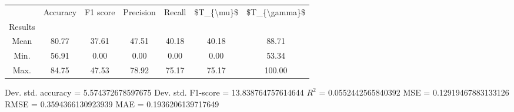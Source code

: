 \begin{tabular}{|c|c|c|c|c|c|c|}
\toprule
{} &  Accuracy &  F1 score &  Precision &  Recall &  \$T\_\{\textbackslash mu\}\$ &  \$T\_\{\textbackslash gamma\}\$ \\
Results &           &           &            &         &            &               \\
\hline
Mean    &     80.77 &     37.61 &      47.51 &   40.18 &      40.18 &         88.71 \\
Min.    &     56.91 &      0.00 &       0.00 &    0.00 &       0.00 &         53.34 \\
Max.    &     84.75 &     47.53 &      78.92 &   75.17 &      75.17 &        100.00 \\
\bottomrule
\end{tabular}

 Dev. std. accuracy = 5.574372678597675
 Dev. std. F1-score = 13.838764757614644
 $R^2$ = 0.0552442565840392
 MSE = 0.12919467883133126
 RMSE = 0.3594366130923939
 MAE = 0.1936206139717649